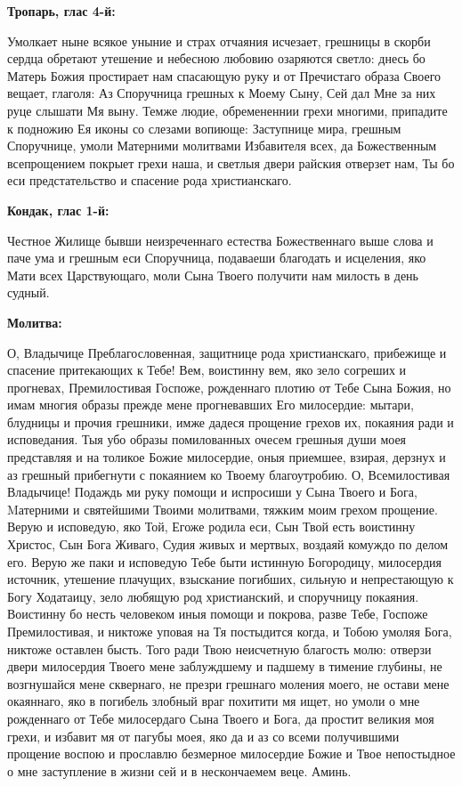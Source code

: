 
\bfseries Тропарь, глас 4-й:\normalfont{}\nopagebreak


Умолкает ныне всякое уныние и страх отчаяния исчезает, грешницы в скорби сердца обретают утешение и небесною любовию озаряются светло: днесь бо Матерь Божия простирает нам спасающую руку и от Пречистаго образа Своего вещает, глаголя: Аз Споручница грешных к Моему Сыну, Сей дал Мне за них руце слышати Мя выну. Темже людие, обремененнии грехи многими, припадите к подножию Ея иконы со слезами вопиюще: Заступнице мира, грешным Споручнице, умоли Матерними молитвами Избавителя всех, да Божественным всепрощением покрыет грехи наша, и светлыя двери райския отверзет нам, Ты бо еси предстательство и спасение рода христианскаго.


\medskip


\bfseries Кондак, глас 1-й:\normalfont{}\nopagebreak


Честное Жилище бывши неизреченнаго естества Божественнаго выше слова и паче ума и грешным еси Споручница, подаваеши благодать и исцеления, яко Мати всех Царствующаго, моли Сына Твоего получити нам милость в день судный.


\medskip


\bfseries Молитва:\normalfont{}\nopagebreak


О, Владычице Преблагословенная, защитнице рода христианскаго, прибежище и спасение притекающих к Тебе! Вем, воистинну вем, яко зело согреших и прогневах, Премилостивая Госпоже, рожденнаго плотию от Тебе Сына Божия, но имам многия образы прежде мене прогневавших Его милосердие: мытари, блудницы и прочия грешники, имже дадеся прощение грехов их, покаяния ради и исповедания. Тыя убо образы помилованных очесем грешныя души моея представляя и на толикое Божие милосердие, оныя приемшее, взирая, дерзнух и аз грешный прибегнути с покаянием ко Твоему благоутробию. О, Всемилостивая Владычице! Подаждь ми руку помощи и испросиши у Сына Твоего и Бога, Mатерними и святейшими Твоими молитвами, тяжким моим грехом прощение. Верую и исповедую, яко Той, Егоже родила еси, Сын Твой есть воистинну Христос, Сын Бога Живаго, Судия живых и мертвых, воздаяй комуждо по делом его. Верую же паки и исповедую Тебе быти истинную Богородицу, милосердия источник, утешение плачущих, взыскание погибших, сильную и непрестающую к Богу Ходатаицу, зело любящую род христианский, и споручницу покаяния. Воистинну бо несть человеком иныя помощи и покрова, разве Тебе, Госпоже Премилостивая, и никтоже уповая на Тя постыдится когда, и Тобою умоляя Бога, никтоже оставлен бысть. Того ради Твою неисчетную благость молю: отверзи двери милосердия Твоего мене заблуждшему и падшему в тимение глубины, не возгнушайся мене сквернаго, не презри грешнаго моления моего, не остави мене окаяннаго, яко в погибель злобный враг похитити мя ищет, но умоли о мне рожденнаго от Тебе милосердаго Сына Твоего и Бога, да простит великия моя грехи, и избавит мя от пагубы моея, яко да и аз со всеми получившими прощение воспою и прославлю безмерное милосердие Божие и Твое непостыдное о мне заступление в жизни сей и в нескончаемем веце. Аминь.


